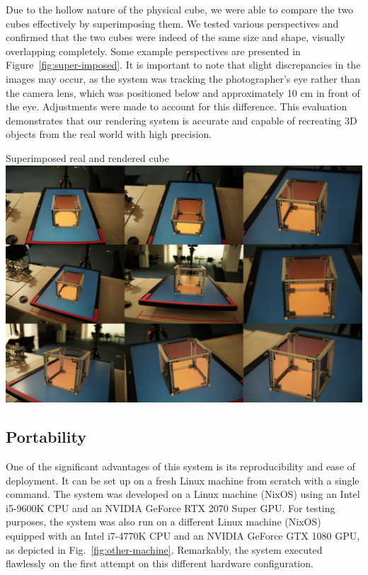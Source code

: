 Due to the hollow nature of the physical cube, we were able to compare the two cubes effectively by superimposing them. We tested various perspectives and confirmed that the two cubes were indeed of the same size and shape, visually overlapping completely. Some example perspectives are presented in Figure~\ref{fig:super-imposed}. It is important to note that slight discrepancies in the images may occur, as the system was tracking the photographer's eye rather than the camera lens, which was positioned below and approximately 10 cm in front of the eye. Adjustments were made to account for this difference. This evaluation demonstrates that our rendering system is accurate and capable of recreating 3D objects from the real world with high precision.

\begin{figureBox}[label={fig:super-imposed}, width=1.0\linewidth]{Superimposed real and rendered cube}
	\includegraphics[width = 1.0\linewidth]{./evaluation/figures/super-imposed.pdf}
\end{figureBox}


\subsection{Portability}
One of the significant advantages of this system is its reproducibility and ease of deployment. It can be set up on a fresh Linux machine from scratch with a single command. The system was developed on a Linux machine (NixOS) using an Intel i5-9600K CPU and an NVIDIA GeForce RTX 2070 Super GPU. For testing purposes, the system was also run on a different Linux machine (NixOS) equipped with an Intel i7-4770K CPU and an NVIDIA GeForce GTX 1080 GPU, as depicted in Fig.~\ref{fig:other-machine}. Remarkably, the system executed flawlessly on the first attempt on this different hardware configuration.

